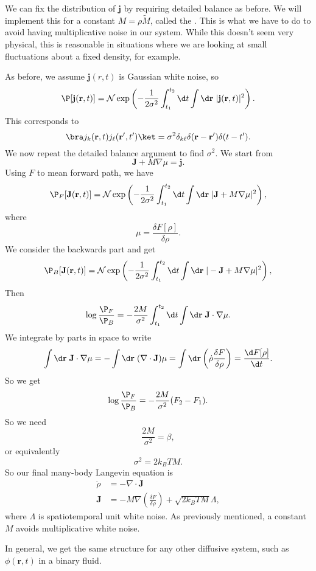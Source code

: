 \documentclass[a4paper]{article}
\begin{document}
We can fix the distribution of $\mathbf{j}$ by requiring detailed balance as before. We will implement this for a constant $M = \rho \tilde{M}$, called the . This is what we have to do to avoid having multiplicative noise in our system. While this doesn't seem very physical, this is reasonable in situations where we are looking at small fluctuations about a fixed density, for example.

As before, we assume $\mathbf{j}(r, t)$ is Gaussian white noise, so
\[
  \P[\mathbf{j}(\mathbf{r}, t)] = \mathcal{N} \exp \left(-\frac{1}{2\sigma^2} \int_{t_1}^{t_2} \d t\int \d \mathbf{r}\; |\mathbf{j}(\mathbf{r}, t)|^2\right).
\]
This corresponds to
\[
  \bra j_k (\mathbf{r}, t)j_\ell(\mathbf{r}', t')\ket = \sigma^2 \delta_{k\ell} \delta(\mathbf{r} - \mathbf{r}') \delta(t - t').
\]
We now repeat the detailed balance argument to find $\sigma^2$. We start from
\[
  \mathbf{J} + M \nabla \mu = \mathbf{j}.
\]
Using $F$ to mean forward path, we have
\[
  \P_F[\mathbf{J}(\mathbf{r}, t)] = \mathcal{N} \exp \left(-\frac{1}{2\sigma^2} \int_{t_1}^{t_2} \d t \int \d \mathbf{r} \; |\mathbf{J} + M \nabla \mu|^2 \right),
\]
where
\[
  \mu = \frac{\delta F[\rho]}{\delta \rho}.
\]
We consider the backwards part and get
\[
  \P_B[\mathbf{J}(\mathbf{r}, t)] = \mathcal{N} \exp \left(-\frac{1}{2\sigma^2} \int_{t_1}^{t_2} \d t \int \d \mathbf{r} \; |-\mathbf{J} + M \nabla \mu|^2 \right),
\]
Then
\[
  \log \frac{\P_F}{\P_B} = - \frac{2M}{\sigma^2} \int_{t_1}^{t_2} \d t \int \d \mathbf{r}\;\mathbf{J} \cdot \nabla \mu.
\]
We integrate by parts in space to write
\[
  \int \d \mathbf{r}\; \mathbf{J} \cdot \nabla \mu = - \int \d \mathbf{r}\; (\nabla \cdot \mathbf{J}) \mu = \int \d \mathbf{r} \left(\dot{\rho} \frac{\delta F}{\delta \rho}\right) = \frac{\d F[\rho]}{\d t}.
\]
So we get
\[
  \log \frac{\P_F}{\P_B} = - \frac{2M}{\sigma^2} (F_2 - F_1).
\]
So we need
\[
  \frac{2M}{\sigma^2} = \beta,
\]
or equivalently
\[
  \sigma^2 = 2k_B T M.
\]
So our final many-body Langevin equation is
\begin{align*}
  \dot{\rho} &= - \nabla \cdot \mathbf{J}\\
  \mathbf{J} &= - M \nabla \left(\frac{\delta F}{\delta \rho}\right) + \sqrt{2k_B T M} \Lambda,
\end{align*}
where $\Lambda$ is spatiotemporal unit white noise. As previously mentioned, a constant $M$ avoids multiplicative white noise.

In general, we get the same structure for any other diffusive system, such as $\phi(\mathbf{r}, t)$ in a binary fluid.
\end{document}
